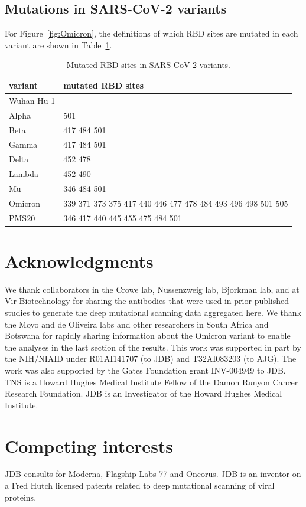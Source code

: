 \documentclass[9pt,twocolumn,twoside]{gsajnl_modified}
\begin{document}
{\subsection{Mutations in SARS-CoV-2 variants}
For Figure~\ref{fig:Omicron}, the definitions of which RBD sites are mutated in each variant are shown in Table~\ref{tab:variants}.
\begin{table}[h]
{\footnotesize
\begin{tabular}{ll}
\toprule
   variant &                                           mutated RBD sites \\
\midrule
Wuhan-Hu-1 &                                                             \\
     Alpha &                                                         501 \\
      Beta &                                                 417 484 501 \\
     Gamma &                                                 417 484 501 \\
     Delta &                                                     452 478 \\
    Lambda &                                                     452 490 \\
        Mu &                                                 346 484 501 \\
   Omicron & 339 371 373 375 417 440 446 477 478 484 493 496 498 501 505 \\
     PMS20 &                             346 417 440 445 455 475 484 501 \\
\bottomrule
\end{tabular}
}
\caption{Mutated RBD sites in SARS-CoV-2 variants.}
\label{tab:variants}
\end{table}

\section{Acknowledgments}
We thank collaborators in the Crowe lab, Nussenzweig lab, Bjorkman lab, and at Vir Biotechnology for sharing the antibodies that were used in prior published studies to generate the deep mutational scanning data aggregated here.
We thank the Moyo and de Oliveira labs and other researchers in South Africa and Botswana for rapidly sharing information about the Omicron variant to enable the analyses in the last section of the results.
This work was supported in part by the NIH/NIAID under R01AI141707 (to JDB) and T32AI083203 (to AJG).
The work was also supported by the Gates Foundation grant INV-004949 to JDB.
TNS is a Howard Hughes Medical Institute Fellow of the Damon Runyon Cancer Research Foundation.
JDB is an Investigator of the Howard Hughes Medical Institute.

\section{Competing interests}
JDB consults for Moderna, Flagship Labs 77 and Oncorus.
JDB is an inventor on a Fred Hutch licensed patents related to deep mutational scanning of viral proteins.


}
\end{document}
